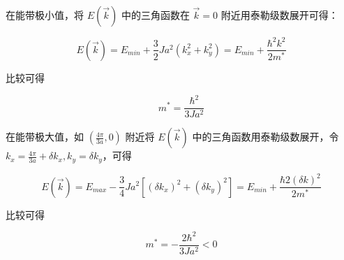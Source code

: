 在能带极小值，将 $E(\vec{k})$ 中的三角函数在 $\vec{k}=0$ 附近用泰勒级数展开可得：

\begin{equation*}
    E(\vec{k}) = E_{min} + \frac{3}{2} J a^2 (k_x^2 + k_y^2) = E_{min} + \frac{\hbar^2 k^2}{2 m^*}
\end{equation*}

比较可得

\begin{equation*}
    m^* = \frac{\hbar^2}{3J a^2}
\end{equation*}

在能带极大值，如 $(\frac{4\pi}{3a}, 0)$ 附近将 $E(\vec{k})$ 中的三角函数用泰勒级数展开，令 $k_x=\frac{4\pi}{3a}+\delta k_x, k_y=\delta k_y$，可得

\begin{equation*}
    E(\vec{k}) = E_{max} - \frac{3}{4}J a^2 \left[(\delta k_x)^2 + (\delta k_y)^2\right] = E_{min} + \frac{\hbar2 (\delta k)^2}{2 m^*}
\end{equation*}

比较可得

\begin{equation*}
    m^* = -\frac{2\hbar^2}{3J a^2} < 0
\end{equation*}

